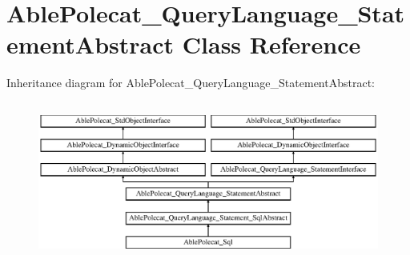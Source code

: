 \hypertarget{class_able_polecat___query_language___statement_abstract}{}\section{Able\+Polecat\+\_\+\+Query\+Language\+\_\+\+Statement\+Abstract Class Reference}
\label{class_able_polecat___query_language___statement_abstract}
Inheritance diagram for Able\+Polecat\+\_\+\+Query\+Language\+\_\+\+Statement\+Abstract\+:\begin{figure}[H]
\begin{center}
\leavevmode
\includegraphics[height=5.266458cm]{class_able_polecat___query_language___statement_abstract}
\end{center}
\end{figure}
